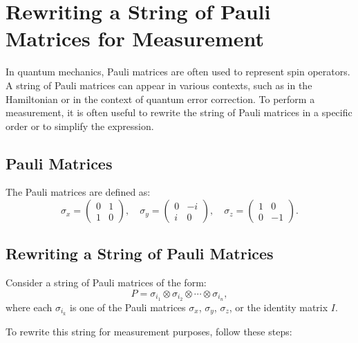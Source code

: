 \documentclass{article}
\begin{document}
\section*{Rewriting a String of Pauli Matrices for Measurement}

In quantum mechanics, Pauli matrices are often used to represent spin operators. A string of Pauli matrices can appear in various contexts, such as in the Hamiltonian or in the context of quantum error correction. To perform a measurement, it is often useful to rewrite the string of Pauli matrices in a specific order or to simplify the expression.

\subsection*{Pauli Matrices}

The Pauli matrices are defined as:
\[
\sigma_x = \begin{pmatrix} 0 & 1 \\ 1 & 0 \end{pmatrix}, \quad
\sigma_y = \begin{pmatrix} 0 & -i \\ i & 0 \end{pmatrix}, \quad
\sigma_z = \begin{pmatrix} 1 & 0 \\ 0 & -1 \end{pmatrix}.
\]

\subsection*{Rewriting a String of Pauli Matrices}

Consider a string of Pauli matrices of the form:
\[
P = \sigma_{i_1} \otimes \sigma_{i_2} \otimes \cdots \otimes \sigma_{i_n},
\]
where each $\sigma_{i_k}$ is one of the Pauli matrices $\sigma_x$, $\sigma_y$, $\sigma_z$, or the identity matrix $I$.

To rewrite this string for measurement purposes, follow these steps:
\end{document}
